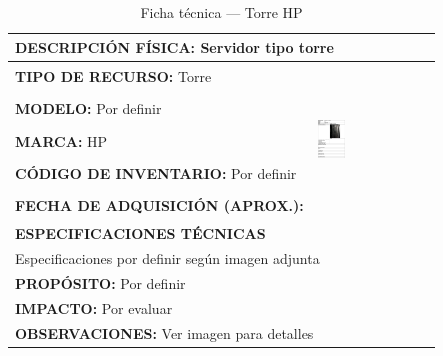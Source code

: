 
\begin{table}[H]
\centering
\caption{Ficha técnica --- Torre HP}
\label{tab:torre-hp-1}
\begin{tabular}{|p{}|p{}|}
\hline
\multicolumn{2}{|l|}{\textbf{DESCRIPCIÓN FÍSICA:} Servidor tipo torre} \\ \hline
\textbf{TIPO DE RECURSO:} Torre &
\multirow{5}{*}{\includegraphics[width=0.25\textwidth,height=4cm,keepaspectratio]{tablas-images/cp1/torres/torre-1.png}} \\ \cline{1-1}
\textbf{MODELO:} Por definir & \\ \cline{1-1}
\textbf{MARCA:} HP & \\ \cline{1-1}
\textbf{CÓDIGO DE INVENTARIO:} Por definir & \\ \cline{1-1}
\textbf{FECHA DE ADQUISICIÓN (APROX.):} & \\ \hline
\multicolumn{2}{|l|}{\textbf{ESPECIFICACIONES TÉCNICAS}} \\ \hline
\multicolumn{2}{|p{0.95\textwidth}|}{
\footnotesize
Especificaciones por definir según imagen adjunta
} \\ \hline
\multicolumn{2}{|l|}{\textbf{PROPÓSITO:} Por definir} \\ \hline
\multicolumn{2}{|l|}{\textbf{IMPACTO:} Por evaluar} \\ \hline
\multicolumn{2}{|l|}{\textbf{OBSERVACIONES:} Ver imagen para detalles} \\ \hline
\end{tabular}
\end{table}

